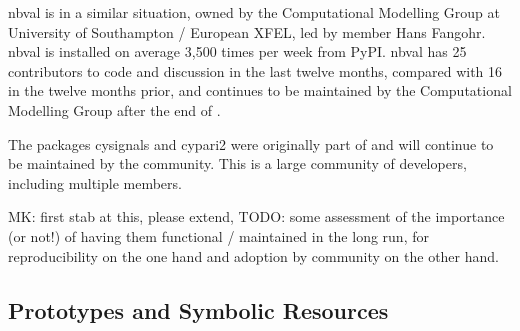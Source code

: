 \documentclass{deliverablereport}
\begin{document}
nbval is in a similar situation,
owned by the Computational Modelling Group at University of Southampton / European XFEL,
led by \ODK member Hans Fangohr.
nbval is installed on average 3,500 times per week from PyPI.
nbval has 25 contributors to code and discussion in the last twelve months,
compared with 16 in the twelve months prior,
and continues to be maintained by the Computational Modelling Group after the end of \ODK.

The packages cysignals and cypari2 were originally part of \Sage
and will continue to be maintained by the \Sage community.
This is a large community of developers, including multiple \ODK members.

\begin{newpart}{MK: first stab at this, please extend, TODO: some assessment of the importance (or not!) of having them functional / maintained in the long run, for reproducibility on the one hand and adoption by community on the other hand.}
  \subsection{Prototypes and Symbolic Resources}


\end{newpart}
\end{document}
